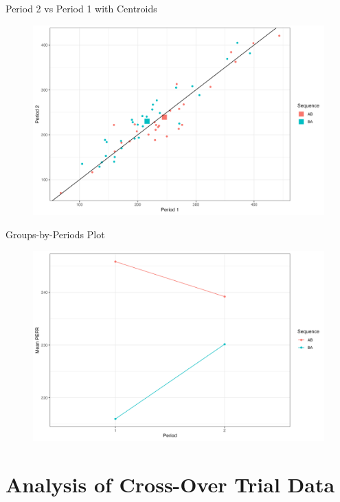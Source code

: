 \documentclass{beamer}
\begin{document}
\begin{frame}{Period 2 vs Period 1 with Centroids}
    \begin{figure}
        \centering
        \includegraphics[width=\linewidth]{report/figures/ch2/centroidsPlot.png}
    \end{figure}
\end{frame}

\begin{frame}{Groups-by-Periods Plot}
    \begin{figure}
        \centering
        \includegraphics[width=\linewidth]{report/figures/ch2/groupsByPeriodsPlot.png}
    \end{figure}
\end{frame}

\section{Analysis of Cross-Over Trial Data}
\end{document}
